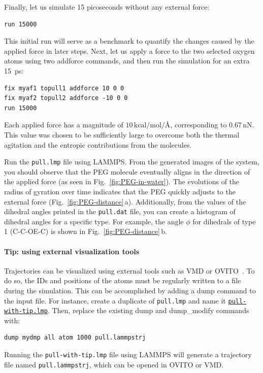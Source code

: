 \documentclass[9pt,tutorial]{livecoms}
\newcommand{\lmpcmd}[1]{\hspace{0pt}\colorbox{listing}{\textcolor{command}{\small{#1}}}\hspace{0pt}} %
\newcommand{\flecmd}[1]{\textcolor{command}{\texttt{#1}}} %
\newcommand{\dwlcmd}[1]{\textcolor{download}{\texttt{#1}}} %
\newcommand{\filepath}{https://raw.githubusercontent.com/lammpstutorials/lammpstutorials-article/main/files/}
\begin{document}
Finally, let us simulate 15 picoseconds without any external force:
\begin{lstlisting}
run 15000
\end{lstlisting}
This initial run will serve as a benchmark to quantify the changes caused by
the applied force in later steps.  Next, let us apply a force to the two selected
oxygen atoms using two \lmpcmd{addforce} commands, and then run the simulation
for an extra 15~ps:
\begin{lstlisting}
fix myaf1 topull1 addforce 10 0 0
fix myaf2 topull2 addforce -10 0 0
run 15000
\end{lstlisting}
Each applied force has a magnitude of $10\,\text{kcal/mol/\AA{}}$, corresponding to $0.67\,\text{nN}$.
This value was chosen to be sufficiently large to overcome both the thermal agitation and
the entropic contributions from the molecules.

Run the \flecmd{pull.lmp} file using LAMMPS.  From the generated images of the system,
you should observe that the PEG molecule eventually aligns
in the direction of the applied force (as seen in Fig.~\ref{fig:PEG-in-water}).
The evolutions of the radius of gyration over
time indicates that the PEG quickly adjusts to the external force
(Fig.~\ref{fig:PEG-distance}\,a).  Additionally, from the values of the dihedral angles
printed in the \flecmd{pull.dat} file, you can create a histogram
of dihedral angles for a specific type.  For example, the angle $\phi$ for dihedrals
of type 1 (C-C-OE-C) is shown in Fig.~\ref{fig:PEG-distance}\,b.

\paragraph{Tip: using external visualization tools}
\label{tip-external-viz}

Trajectories can be visualized using external tools such as VMD or
OVITO~\cite{humphrey1996vmd, ovito_paper}.  To do so, the IDs and
positions of the atoms must be regularly written to a file during the
simulation.  This can be accomplished by adding a \lmpcmd{dump} command
to the input file.  For instance, create a duplicate of
\flecmd{pull.lmp} and name it
\href{\filepath tutorial3/solution/pull-with-tip.lmp}{\dwlcmd{pull-with-tip.lmp}}.
Then, replace the existing \lmpcmd{dump} and \lmpcmd{dump\_modify} commands with:
\begin{lstlisting}
dump mydmp all atom 1000 pull.lammpstrj
\end{lstlisting}
Running the \flecmd{pull-with-tip.lmp} file using LAMMPS will generate a trajectory file
named \flecmd{pull.lammpstrj}, which can be opened in OVITO or VMD.
\end{document}
